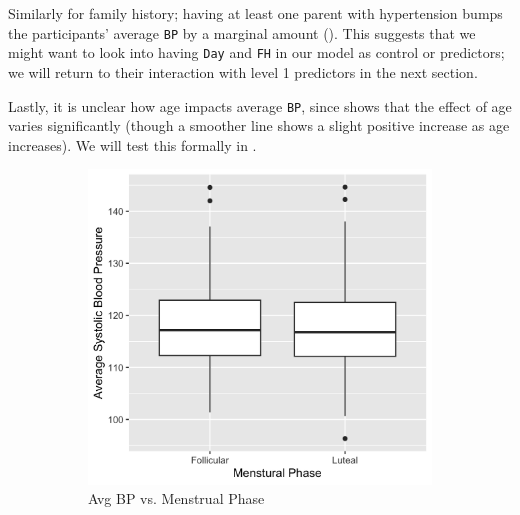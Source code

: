 \documentclass[12pt,twoside,letterpaper]{article}
\theoremstyle{definition}
\theoremstyle{definition}
\begin{document}
Similarly for family history; having at least one parent with hypertension bumps the participants' average \texttt{BP} by a marginal amount (). This suggests that we might want to look into having \texttt{Day} and \texttt{FH} in our model as control or predictors; we will return to their interaction with level 1 predictors in the next section. 

Lastly, it is unclear how age impacts average \texttt{BP}, since  shows that the effect of age varies significantly (though a smoother line shows a slight positive increase as age increases). We will test this formally in .

\begin{figure} 
    \centering
    \begin{subfigure}{0.48\textwidth}
        \centering
        \includegraphics[width=\textwidth]{pics/bp v phase.png}
        \caption{{\small Avg BP vs. Menstrual Phase}}
        \label{fig: bp v phase}
    \end{subfigure}
    \hfill
    \begin{subfigure}{0.48\textwidth}
        \centering

\end{subfigure}
\end{figure}
\end{document}
